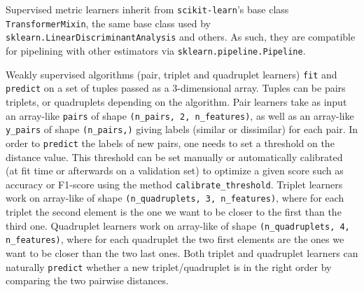 \documentclass[twoside,11pt]{article}
\newcommand{\aurelien}[1]{\todo[inline,caption={},color=orange!40]{{\it Aurelien:~}#1}}
\newcommand{\william}[1]{\todo[inline,caption={},color=blue!40]{{\it William:~}#1}}
\begin{document}
Supervised metric learners inherit from \texttt{scikit-learn}'s base class \texttt{TransformerMixin}, the same base class used by \texttt{sklearn.LinearDiscriminantAnalysis} and others.
As such, they are compatible for pipelining with other estimators via \texttt{sklearn.pipeline.Pipeline}.

Weakly supervised algorithms (pair, triplet and quadruplet learners) \texttt{fit} and \texttt{predict} on a set of tuples passed as a 3-dimensional array. Tuples can be pairs triplets, or quadruplets depending on the algorithm.
Pair learners take as input an array-like \texttt{pairs} of shape \texttt{(n\_pairs, 2, n\_features)}, as well as an array-like \texttt{y\_pairs} of shape \texttt{(n\_pairs,)} giving labels (similar or dissimilar) for each pair.
In order to \texttt{predict} the labels of new pairs, one needs to set a threshold on the distance value.
This threshold can be set manually or automatically calibrated (at fit time or afterwards on a validation set) to optimize a given score such as accuracy or F1-score using the method \texttt{calibrate\_threshold}.
Triplet learners work on array-like of shape \texttt{(n\_quadruplets, 3, n\_features)}, where for each triplet the second element is the one we want to be closer to the first than the third one.
Quadruplet learners work on array-like of shape \texttt{(n\_quadruplets, 4, n\_features)}, where for each quadruplet the two first elements are the ones we want to be closer than the two last ones. Both triplet and quadruplet learners can naturally \texttt{predict} whether a new triplet/quadruplet is in the right order by comparing the two pairwise distances.
\end{document}
